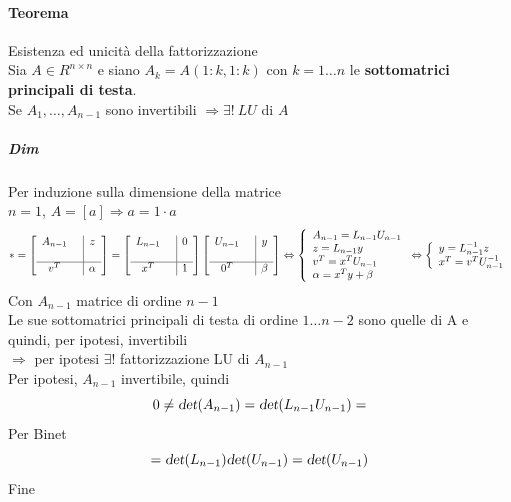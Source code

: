\documentclass[10pt]{book}
\begin{document}
\paragraph{Teorema} Esistenza ed unicità della fattorizzazione\\
Sia $A \in R^{n \times n}$ e siano $A_k = A(1:k, 1:k)$ con $k = 1\ldots n$ le \textbf{sottomatrici principali di testa}.\\
Se $A_1, \ldots, A_{n-1}$ sono invertibili $\Rightarrow\exists !\: LU$ di $A$
\subparagraph{Dim} Per induzione sulla dimensione della matrice\\
$n = 1$, $A = [a] \Rightarrow a = 1\cdot a$
$$* = \left[ 
\begin{array}{c c | c}
	A_{n-1} & & z\\
	& &\\
	\hline
	v^T & & \alpha
\end{array}
\right]
= \left[ 
\begin{array}{c c | c}
	L_{n-1} & & 0\\
	& &\\
	\hline
	x^T & & 1
\end{array}
\right]
\left[ 
\begin{array}{c c | c}
	U_{n-1} & & y\\
	& &\\
	\hline
	0^T & & \beta
\end{array}
\right]
\Leftrightarrow
\left\{
\begin{array}{l}
A_{n-1} = L_{n-1}U_{n-1}\\
z = L_{n-1}y\\
v^T = x^T U_{n-1}\\
\alpha = x^T y + \beta
\end{array}
\right.
\Leftrightarrow
\left\{
\begin{array}{l}
y = L_{n-1}^{-1}z\\
x^T = v^T U_{n-1}^{-1}\\
\end{array}
\right.
$$
Con $A_{n-1}$ matrice di ordine $n - 1$\\
Le sue sottomatrici principali di testa di ordine $1\ldots n-2$ sono quelle di A e quindi, per ipotesi, invertibili\\
$\Rightarrow$ per ipotesi $\exists !$ fattorizzazione LU di $A_{n-1}$\\
Per ipotesi, $A_{n-1}$ invertibile, quindi
$$0 \neq \textsl{det}(A_{n-1}) = \textsl{det}(L_{n-1}U_{n-1}) =$$
Per Binet
$$ = \textsl{det}(L_{n-1})\textsl{det}(U_{n-1}) = \textsl{det}(U_{n-1})$$
Fine
\end{document}
